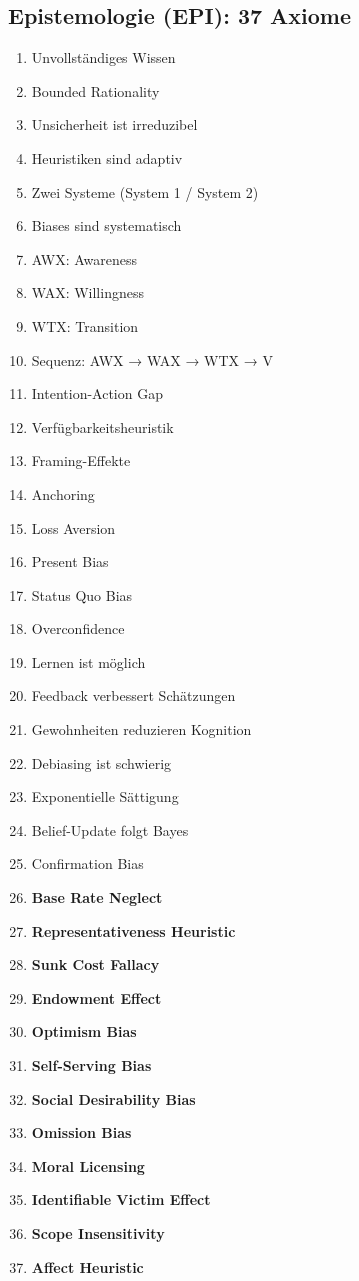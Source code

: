 \subsection{Epistemologie (EPI): 37 Axiome}
\begin{enumerate}[label=MA-EPI-\arabic*:, leftmargin=3cm]
    \item Unvollständiges Wissen
    \item Bounded Rationality
    \item Unsicherheit ist irreduzibel
    \item Heuristiken sind adaptiv
    \item Zwei Systeme (System 1 / System 2)
    \item Biases sind systematisch
    \item AWX: Awareness
    \item WAX: Willingness
    \item WTX: Transition
    \item Sequenz: AWX → WAX → WTX → V
    \item Intention-Action Gap
    \item Verfügbarkeitsheuristik
    \item Framing-Effekte
    \item Anchoring
    \item Loss Aversion
    \item Present Bias
    \item Status Quo Bias
    \item Overconfidence
    \item Lernen ist möglich
    \item Feedback verbessert Schätzungen
    \item Gewohnheiten reduzieren Kognition
    \item Debiasing ist schwierig
    \item Exponentielle Sättigung
    \item Belief-Update folgt Bayes
    \item Confirmation Bias
    \item \textbf{Base Rate Neglect}
    \item \textbf{Representativeness Heuristic}
    \item \textbf{Sunk Cost Fallacy}
    \item \textbf{Endowment Effect}
    \item \textbf{Optimism Bias}
    \item \textbf{Self-Serving Bias}
    \item \textbf{Social Desirability Bias}
    \item \textbf{Omission Bias}
    \item \textbf{Moral Licensing}
    \item \textbf{Identifiable Victim Effect}
    \item \textbf{Scope Insensitivity}
    \item \textbf{Affect Heuristic}
\end{enumerate}

